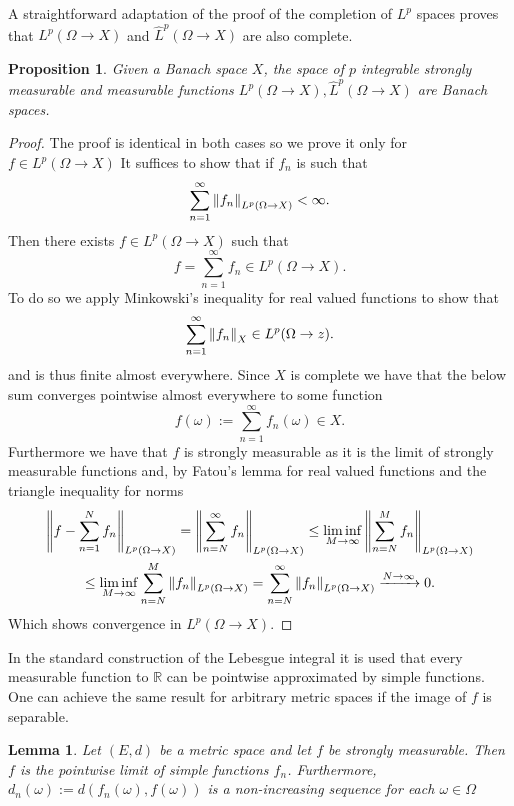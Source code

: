 \documentclass[12pt]{article}
\newcommand{\R}zzzzz
\newtheorem{proposition}{Proposition}
\newtheorem{lemma}{Lemma}
\begin{document}
A straightforward adaptation of the proof of the completion of $L^p$ spaces proves that $L^p(\Omega\to X)$ and $\hat{L}^p(\Omega\to X)$ are also complete.
\begin{proposition}
	Given a Banach space $X$, the space of $p$ integrable strongly measurable and measurable functions $L^p(\Omega\to X),\hat{L}^p(\Omega\to X)$ are Banach spaces.
\end{proposition}
\begin{proof}
	The proof is identical in both cases so we prove it only for $f\in L^p(\Omega\to X)$
	It suffices to show that if $f_n$ is such that
	\begin{equation*}
		\sum_{n=1}^\infty \norm{f_n}_{L^p(\Omega\to X)}<\infty.
	\end{equation*}
	Then there exists $f\in L^p(\Omega\to X)$ such that
	\begin{equation*}
		f=\sum_{n=1}^\infty f_n\in L^p(\Omega\to X).
	\end{equation*}
	To do so we apply Minkowski's inequality for real valued functions to show that
	\begin{equation*}
		\sum_{n=1}^\infty \norm{f_n}_X\in L^p(\Omega\to\R).
	\end{equation*}
	and is thus finite almost everywhere. Since $X$ is complete we have that the below sum converges pointwise almost everywhere to some function
	\begin{equation*}
		f(\omega):=\sum_{n=1}^\infty f_n(\omega)\in X.
	\end{equation*}
	Furthermore we have that $f$ is strongly measurable as it is the limit of strongly measurable functions and, by Fatou's lemma for real valued functions and the triangle inequality for norms
	\begin{multline*}
		\norm{f-\sum_{n=1}^N f_n}_{L^p(\Omega\to X)}=\norm{\sum_{n=N}^\infty f_n}_{L^p(\Omega\to X)}\leq \liminf_{M\to \infty}\norm{\sum_{n=N}^M f_n}_{L^p(\Omega\to X)}\\\leq \liminf_{M\to \infty}\sum_{n=N}^M \norm{f_n}_{L^p(\Omega\to X)}=\sum_{n=N}^\infty \norm{f_n}_{L^p(\Omega\to X)}\xrightarrow{N\to\infty} 0.
	\end{multline*}
	Which shows convergence in $L^p(\Omega\to X)$.
\end{proof}
In the standard construction of the Lebesgue integral it is used that every measurable function to $\mathbb{R}$ can be pointwise approximated by simple functions. One can achieve the same result for arbitrary metric spaces if the image of $f$ is separable.
\begin{lemma}
	Let $(E,d)$ be a metric space and let $f$ be strongly measurable. Then $f$ is the pointwise limit of simple functions $f_n$. Furthermore, \\$d_n(\omega):=d(f_n(\omega),f(\omega))$ is a non-increasing sequence for each $\omega\in\Omega$
\end{lemma}
\end{document}
